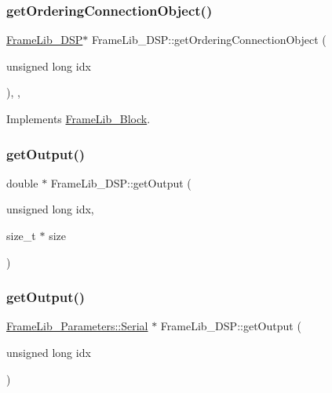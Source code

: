 \subsubsection{\texorpdfstring{get\+Ordering\+Connection\+Object()}{getOrderingConnectionObject()}}
{\footnotesize\ttfamily \hyperlink{class_frame_lib___d_s_p}{Frame\+Lib\+\_\+\+D\+SP}$\ast$ Frame\+Lib\+\_\+\+D\+S\+P\+::get\+Ordering\+Connection\+Object (\begin{DoxyParamCaption}\item[{unsigned long}]{idx }\end{DoxyParamCaption})\hspace{0.3cm}{\ttfamily [inline]}, {\ttfamily [protected]}, {\ttfamily [virtual]}}



Implements \hyperlink{class_frame_lib___block_a783373d2348b0d96b1c731041ba4fb0f}{Frame\+Lib\+\_\+\+Block}.

\mbox{\label{class_frame_lib___d_s_p_a0b93f60dad1696bfbb80cedb5d406c40}} 
\subsubsection{\texorpdfstring{get\+Output()}{getOutput()}\hspace{0.1cm}{\footnotesize\ttfamily [1/2]}}
{\footnotesize\ttfamily double $\ast$ Frame\+Lib\+\_\+\+D\+S\+P\+::get\+Output (\begin{DoxyParamCaption}\item[{unsigned long}]{idx,  }\item[{size\+\_\+t $\ast$}]{size }\end{DoxyParamCaption})\hspace{0.3cm}{\ttfamily [protected]}}

\mbox{\label{class_frame_lib___d_s_p_a614a975377a289f8bdaa2eba0c1c41b6}} 
\subsubsection{\texorpdfstring{get\+Output()}{getOutput()}\hspace{0.1cm}{\footnotesize\ttfamily [2/2]}}
{\footnotesize\ttfamily \hyperlink{class_frame_lib___parameters_1_1_serial}{Frame\+Lib\+\_\+\+Parameters\+::\+Serial} $\ast$ Frame\+Lib\+\_\+\+D\+S\+P\+::get\+Output (\begin{DoxyParamCaption}\item[{unsigned long}]{idx }\end{DoxyParamCaption})\hspace{0.3cm}{\ttfamily [protected]}}

